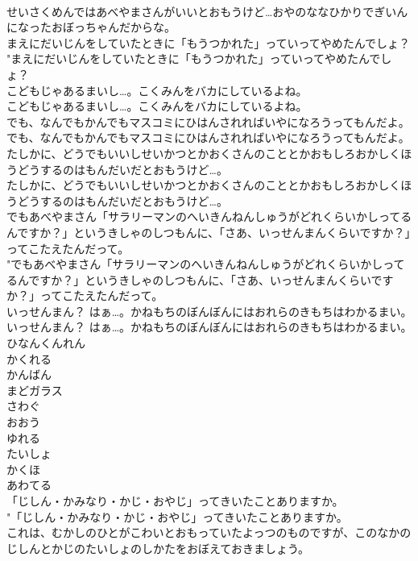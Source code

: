 \documentclass[8pt]{extreport}
\begin{document}
\begin{CJK}{UTF8}{min}
\\	せいさくめんではあべやまさんがいいとおもうけど…おやのななひかりでぎいんになったおぼっちゃんだからな。 
\\	まえにだいじんをしていたときに「もうつかれた」っていってやめたんでしょ？	
\\	"まえにだいじんをしていたときに「もうつかれた」っていってやめたんでしょ？ 
\\	こどもじゃあるまいし…。こくみんをバカにしているよね。	
\\	こどもじゃあるまいし…。こくみんをバカにしているよね。 
\\	でも、なんでもかんでもマスコミにひはんされればいやになろうってもんだよ。	
\\	でも、なんでもかんでもマスコミにひはんされればいやになろうってもんだよ。 
\\	たしかに、どうでもいいしせいかつとかおくさんのこととかおもしろおかしくほうどうするのはもんだいだとおもうけど…。	
\\	たしかに、どうでもいいしせいかつとかおくさんのこととかおもしろおかしくほうどうするのはもんだいだとおもうけど…。 
\\	でもあべやまさん「サラリーマンのへいきんねんしゅうがどれくらいかしってるんですか？」というきしゃのしつもんに、「さあ、いっせんまんくらいですか？」ってこたえたんだって。	
\\	"でもあべやまさん「サラリーマンのへいきんねんしゅうがどれくらいかしってるんですか？」というきしゃのしつもんに、「さあ、いっせんまんくらいですか？」ってこたえたんだって。 
\\	いっせんまん？ はぁ…。かねもちのぼんぼんにはおれらのきもちはわかるまい。	
\\	いっせんまん？ はぁ…。かねもちのぼんぼんにはおれらのきもちはわかるまい。 
\\	ひなんくんれん
\\	かくれる
\\	かんばん
\\	まどガラス
\\	さわぐ
\\	おおう
\\	ゆれる
\\	たいしょ
\\	かくほ
\\	あわてる
\\	「じしん・かみなり・かじ・おやじ」ってきいたことありますか。	
\\	"「じしん・かみなり・かじ・おやじ」ってきいたことありますか。 
\\	これは、むかしのひとがこわいとおもっていたよっつのものですが、このなかのじしんとかじのたいしょのしかたをおぼえておきましょう。	

\end{CJK}
\end{document}
